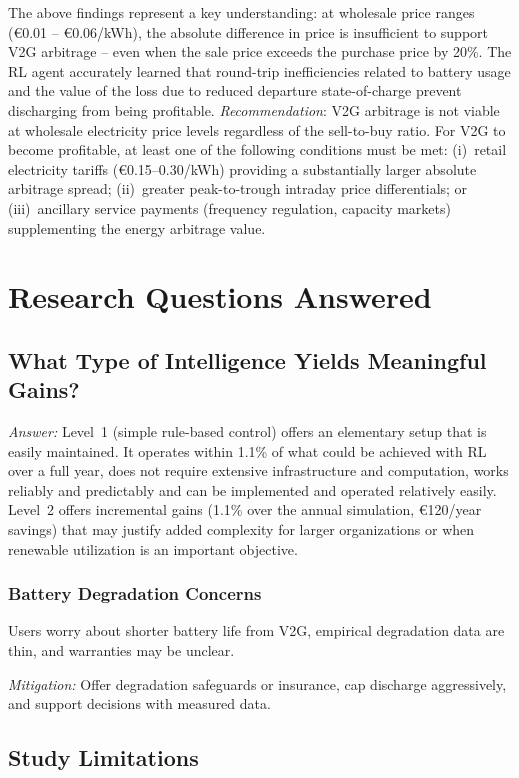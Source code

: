 The above findings represent a key understanding: at wholesale price ranges (€0.01 -- €0.06/kWh), the absolute difference in price is insufficient to support V2G arbitrage -- even when the sale price exceeds the purchase price by 20\%. The RL agent accurately learned that round-trip inefficiencies related to battery usage and the value of the loss due to reduced departure state-of-charge prevent discharging from being profitable.
\textit{Recommendation}: V2G arbitrage is not viable at wholesale electricity price levels regardless of the sell-to-buy ratio. For V2G to become profitable, at least one of the following conditions must be met: (i)~retail electricity tariffs (€0.15--0.30/kWh) providing a substantially larger absolute arbitrage spread; (ii)~greater peak-to-trough intraday price differentials; or (iii)~ancillary service payments (frequency regulation, capacity markets) supplementing the energy arbitrage value. \section{Research Questions Answered} \label{sec:research_questions} \subsection{What Type of Intelligence Yields Meaningful Gains?} \label{subsec:type_of_intelligence_yielding_meaningful_gains} \textit{Answer:} Level~1 (simple rule-based control) offers an elementary setup that is easily maintained. It operates within 1.1\% of what could be achieved with RL over a full year, does not require extensive infrastructure and computation, works reliably and predictably and can be implemented and operated relatively easily. Level~2 offers incremental gains (1.1\% over the annual simulation, €120/year savings) that may justify added complexity for larger organizations or when renewable utilization is an important objective.

\subsubsection{Battery Degradation Concerns}

Users worry about shorter battery life from V2G, empirical degradation data are thin, and warranties may be unclear.

\textit{Mitigation:} Offer degradation safeguards or insurance, cap discharge aggressively, and support decisions with measured data.

\subsection{Study Limitations}
\label{subsec:study_limitations}

